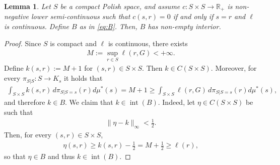 \documentclass[10pt,a4paper]{amsart}
\newtheorem{lemma}{Lemma}
\newcommand{\R}{\mathbb{R}} %
\begin{document}
\begin{lemma}\label{lemma:fenchel-requirements}
    Let $S$ be a compact Polish space, and assume $c:S\times S\to\R_+$ is non-negative lower semi-continuous such that $c(s,r)=0$ if and only if $s=r$ and $\ell$ is continuous. Define  $B$ as in \eqref{eq:B}. Then, $B$ has non-empty interior.
\end{lemma}

\begin{proof}
Since $S$ is compact and
$\ell$ is continuous, there exists
\begin{align*}
M:=\sup_{r\in S}\ell(r,G)<+\infty .
\end{align*}
Define $k(s,r):=M+1$ for $ (s,r)\in S\times S$.
Then \(k\in C(S\times S)\). Moreover, for every $\pi_{S|S} :S \rightarrow K_s$ it holds that
\begin{align*}
\int_{S\times S} k(s,r)\,d\pi_{S|S=s}(r)d\mu^*(s)
=
M+1
\geq
\int_{S\times S}\ell(r,G)\,d\pi_{S|S=s}(r)d\mu^*(s),
\end{align*}
and therefore $k\in B$.
We claim that $k\in \operatorname{int}(B)$. Indeed, let
$\eta\in C(S\times S)$ be such that
\begin{align*}
\|\eta-k\|_\infty<\frac12 .
\end{align*}
Then, for every \((s,r)\in S\times S\),
\begin{align*}
\eta(s,r)
\geq
k(s,r)-\frac12
=
M+\frac12
\geq
\ell(r),
\end{align*}
so that $\eta \in B$ and thus $k\in\operatorname{int}(B)$.

    

\end{proof}
\end{document}
